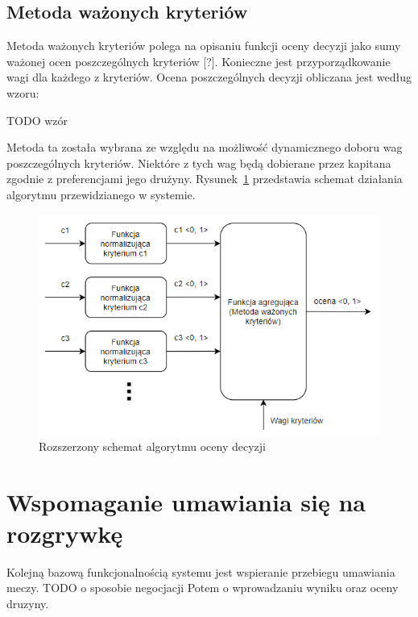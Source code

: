\subsection{Metoda ważonych kryteriów}

Metoda ważonych kryteriów polega na opisaniu funkcji oceny decyzji jako sumy ważonej ocen poszczególnych kryteriów [?]. Konieczne jest przyporządkowanie wagi dla każdego z kryteriów. Ocena poszczególnych decyzji obliczana jest według wzoru: 

TODO wzór

Metoda ta została wybrana ze względu na możliwość dynamicznego doboru wag poszczególnych kryteriów. Niektóre z tych wag będą dobierane przez kapitana zgodnie z preferencjami jego drużyny. Rysunek~\ref{fig:diagram-alg-ext} przedstawia schemat działania algorytmu przewidzianego w systemie.


\begin{figure}[ht]
\centering
\includegraphics[width=0.8\linewidth]{03-koncept/rys/algorytm.PNG}
\caption{Rozszerzony schemat algorytmu oceny decyzji}
\label{fig:diagram-alg-ext}
\end{figure}


\section{Wspomaganie umawiania się na rozgrywkę}

Kolejną bazową funkcjonalnością systemu jest wspieranie przebiegu umawiania meczy. TODO o sposobie negocjacji Potem o wprowadzaniu wyniku oraz oceny druzyny.

